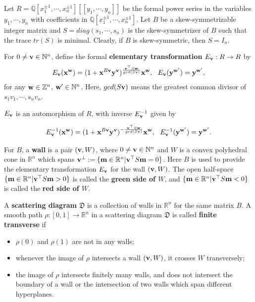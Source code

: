 \documentclass[14pt]{amsart}
\begin{document}
Let $R=\mathbb Q[x_1^{\pm1},\cdots,x_n^{\pm1}][[y_1,\cdots,y_n]]$ be the formal power series in the variables $y_1,\cdots,y_n$  with coefficients in $\mathbb Q[x_1^{\pm1},\cdots,x_n^{\pm1}]$. Let $B$ be a skew-symmetrizable integer matrix  and $S=diag(s_1,\cdots,s_n)$ is the skew-symmetrizer of $B$  such that the trace $tr(S)$  is minimal. Clearly, if $B$ is skew-symmetric, then $S=I_n$.

For $0\neq{\bf v}\in\mathbb N^n$, define the formal {\bf elementary transformation} $E_{\bf v}:R\rightarrow R$ by
$$E_{\bf v}({\bf x}^{\bf w})=(1+{\bf x}^{B\bf v}{\bf y}^{\bf v})^{\frac{{\bf v}^{\top}S{\bf w}}{gcd(S{\bf v})}}{\bf x}^{\bf w}, ~~E_{\bf v}({\bf y}^{{\bf w}^{\prime}})={\bf y}^{{\bf w}^{\prime}},$$
  for any ${\bf w}\in\mathbb Z^n$, ${\bf w}^\prime\in\mathbb N^n$. Here, $gcd(S{\bf v})$ means the greatest common divisor of $s_1v_1,\cdots,s_nv_n$.

$E_{\bf v}$ is an automorphism of $R$, with inverse $E_{\bf v}^{-1}$ given by

$$E_{\bf v}^{-1}({\bf x}^{\bf w})=(1+{\bf x}^{B\bf v}{\bf y}^{\bf v})^{-\frac{{\bf v}^{\top}S{\bf w}}{gcd(S{\bf v})}}{\bf x}^{\bf w}, ~~E_{\bf v}^{-1}({\bf y}^{{\bf w}^{\prime}})={\bf y}^{{\bf w}^{\prime}}.$$


For $B$, a {\bf wall} is a pair $({\bf v},W)$, where $0\neq {\bf v}\in \mathbb N^n$ and $W$ is a convex polyhedral cone in $\mathbb R^n$ which spans ${\bf v}^{\bot}:=\{{\bf m}\in \mathbb R^n|{\bf v}^\top S {\bf m}=0\}$. Here $B$ is used to provide the elementary transformation $E_{\bf v}$ for the wall  $({\bf v},W)$. The open half-space $\{{\bf m}\in \mathbb R^n|{\bf v}^\top S {\bf m}>0\}$ is called the {\bf green side of $W$}, and $\{{\bf m}\in \mathbb R^n|{\bf v}^\top S {\bf m}<0\}$ is called  the
{\bf red side of $W$}.

A {\bf scattering diagram} $\mathfrak D$ is a collection of walls in $\mathbb R^n$ for the same matrix $B$. A
smooth path $\rho:[0,1]\rightarrow\mathbb R^n$ in a scattering diagram $\mathfrak D$  is called {\bf finite transverse} if
\begin{itemize}
\item $\rho(0)$ and $\rho(1)$ are not in any walls;
\item whenever the image of $\rho$ intersects a wall $({\bf v},W)$, it crosses $W$ transversely;
\item the image of $\rho$ intersects finitely many walls, and does not intersect the boundary
of a wall or the intersection of two walls which span different hyperplanes.
\end{itemize}
\end{document}
